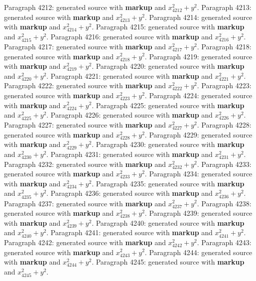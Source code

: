 \documentclass{article}
\begin{document}
Paragraph 4212: generated source with \textbf{markup} and $x_{4212}^2 + y^2$.
Paragraph 4213: generated source with \textbf{markup} and $x_{4213}^2 + y^2$.
Paragraph 4214: generated source with \textbf{markup} and $x_{4214}^2 + y^2$.
Paragraph 4215: generated source with \textbf{markup} and $x_{4215}^2 + y^2$.
Paragraph 4216: generated source with \textbf{markup} and $x_{4216}^2 + y^2$.
Paragraph 4217: generated source with \textbf{markup} and $x_{4217}^2 + y^2$.
Paragraph 4218: generated source with \textbf{markup} and $x_{4218}^2 + y^2$.
Paragraph 4219: generated source with \textbf{markup} and $x_{4219}^2 + y^2$.
Paragraph 4220: generated source with \textbf{markup} and $x_{4220}^2 + y^2$.
Paragraph 4221: generated source with \textbf{markup} and $x_{4221}^2 + y^2$.
Paragraph 4222: generated source with \textbf{markup} and $x_{4222}^2 + y^2$.
Paragraph 4223: generated source with \textbf{markup} and $x_{4223}^2 + y^2$.
Paragraph 4224: generated source with \textbf{markup} and $x_{4224}^2 + y^2$.
Paragraph 4225: generated source with \textbf{markup} and $x_{4225}^2 + y^2$.
Paragraph 4226: generated source with \textbf{markup} and $x_{4226}^2 + y^2$.
Paragraph 4227: generated source with \textbf{markup} and $x_{4227}^2 + y^2$.
Paragraph 4228: generated source with \textbf{markup} and $x_{4228}^2 + y^2$.
Paragraph 4229: generated source with \textbf{markup} and $x_{4229}^2 + y^2$.
Paragraph 4230: generated source with \textbf{markup} and $x_{4230}^2 + y^2$.
Paragraph 4231: generated source with \textbf{markup} and $x_{4231}^2 + y^2$.
Paragraph 4232: generated source with \textbf{markup} and $x_{4232}^2 + y^2$.
Paragraph 4233: generated source with \textbf{markup} and $x_{4233}^2 + y^2$.
Paragraph 4234: generated source with \textbf{markup} and $x_{4234}^2 + y^2$.
Paragraph 4235: generated source with \textbf{markup} and $x_{4235}^2 + y^2$.
Paragraph 4236: generated source with \textbf{markup} and $x_{4236}^2 + y^2$.
Paragraph 4237: generated source with \textbf{markup} and $x_{4237}^2 + y^2$.
Paragraph 4238: generated source with \textbf{markup} and $x_{4238}^2 + y^2$.
Paragraph 4239: generated source with \textbf{markup} and $x_{4239}^2 + y^2$.
Paragraph 4240: generated source with \textbf{markup} and $x_{4240}^2 + y^2$.
Paragraph 4241: generated source with \textbf{markup} and $x_{4241}^2 + y^2$.
Paragraph 4242: generated source with \textbf{markup} and $x_{4242}^2 + y^2$.
Paragraph 4243: generated source with \textbf{markup} and $x_{4243}^2 + y^2$.
Paragraph 4244: generated source with \textbf{markup} and $x_{4244}^2 + y^2$.
Paragraph 4245: generated source with \textbf{markup} and $x_{4245}^2 + y^2$.
\end{document}
